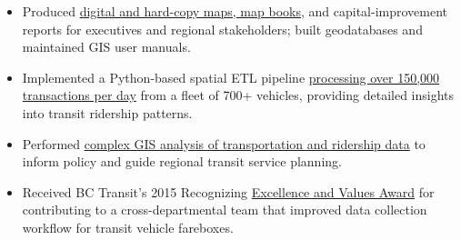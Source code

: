 \documentclass[letterpaper]{article}
\newenvironment{jobtasklist}
        {
            \vspace{-12pt}
            \begin{itemize} \itemsep 0pt
        }{
            \end{itemize}
            \vspace{-3pt}
        }
\newcommand{\impt}[1]{\uline{#1}}
\begin{document}
\begin{jobtasklist}
    \item Produced \impt{digital and hard-copy maps, map books}, and capital-improvement
            reports for executives and regional stakeholders; built geodatabases and
            maintained GIS user manuals.
    \item Implemented a Python-based spatial ETL pipeline
            \impt{processing over 150,000 transactions per day}
            from a fleet of 700+ vehicles, providing detailed insights into transit ridership patterns.
    \item Performed \impt{complex GIS analysis of transportation and ridership data} to
            inform policy and guide regional transit service planning.
    \item Received BC Transit’s 2015 Recognizing \impt{Excellence and Values Award}
            for contributing to a cross-departmental team that
            improved data collection workflow for transit vehicle fareboxes.
\end{jobtasklist}
\end{document}
